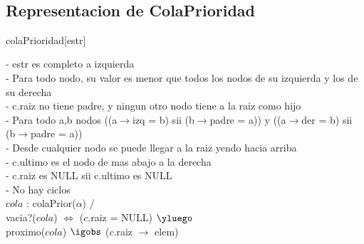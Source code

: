 $ $\newline
$ $\newline

\begin{Representacion}
\subsection{Representacion de ColaPrioridad}
 
\begin{Estructura}{colaPrioridad}[estr]
    \begin{Tupla}[estr]%
  \end{Tupla}
\end{Estructura}

\begin{Tupla}[nodo]
\end{Tupla}


	
- estr es completo a izquierda \\
- Para todo nodo, su valor es menor que todos los nodos de su izquierda y los de su derecha \\
- c.raiz no tiene padre, y ningun otro nodo tiene a la raiz como hijo \\
- Para todo a,b nodos  ((a$\to$izq = b) sii (b$\to$padre = a)) y ((a$\to$der = b) sii (b$\to$padre = a)) \\
- Desde cualquier nodo se puede llegar a la raiz yendo hacia arriba \\
- c.ultimo es el nodo de mas abajo a la derecha \\
- c.raiz es NULL sii c.ultimo es NULL \\
- No hay ciclos \\

%
{
$cola$ : colaPrior($\alpha$) / \\
	vacia?($cola$)  $\iff$  ($c$.raiz = NULL) $\yluego$ \\
	proximo($cola$) $\igobs$ ($c$.raiz $\to$ elem) \\
}%

\end{Representacion}


